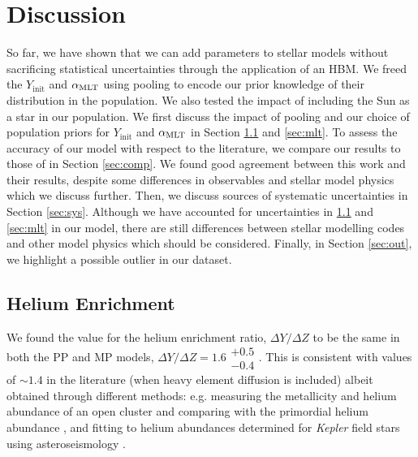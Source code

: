 \section{Discussion}\label{sec:dis}



So far, we have shown that we can add parameters to stellar models without sacrificing statistical uncertainties through the application of an HBM. We freed the $Y_\mathrm{init}$ and ${\alpha_\mathrm{MLT}}$ using pooling to encode our prior knowledge of their distribution in the population. We also tested the impact of including the Sun as a star in our population. We first discuss the impact of pooling and our choice of population priors for $Y_\mathrm{init}$ and ${\alpha_\mathrm{MLT}}$ in Section \ref{sec:helium} and \ref{sec:mlt}. To assess the accuracy of our model with respect to the literature, we compare our results to those of  in Section \ref{sec:comp}. We found good agreement between this work and their results, despite some differences in observables and stellar model physics which we discuss further. Then, we discuss sources of systematic uncertainties in Section \ref{sec:sys}. Although we have accounted for uncertainties in \ref{sec:helium} and \ref{sec:mlt} in our model, there are still differences between stellar modelling codes and other model physics which should be considered. Finally, in Section \ref{sec:out}, we highlight a possible outlier in our dataset.

\subsection{Helium Enrichment}\label{sec:helium}

We found the value for the helium enrichment ratio, $\Delta Y / \Delta Z$ to be the same in both the PP and MP models, $\Delta Y / \Delta Z = 1.6\substack{+0.5\\-0.4}$. This is consistent with values of $\sim 1.4$ in the literature (when heavy element diffusion is included) albeit obtained through different methods: e.g. measuring the metallicity and helium abundance of an open cluster and comparing with the primordial helium abundance \citep{Brogaard.VandenBerg.ea2012}, and fitting to helium abundances determined for \emph{Kepler} field stars using asteroseismology \citep{Verma.Raodeo.ea2019}.

